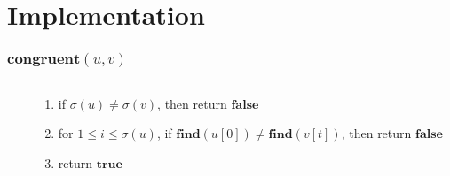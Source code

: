 \documentclass{beamer}
\begin{document}
\section{Implementation}

\begin{frame}[fragile]
  \frametitle{$\mathbf{congruent}(u, v)$}

  \begin{columns}[T]
    \begin{column}{0.5\textwidth}
    \end{column}
    \begin{column}{0.5\textwidth}
      \begin{enumerate}
        \item if $\sigma(u) \neq \sigma(v)$, then return $\mathbf{false}$
        \item for $1 \leq i \leq \sigma(u)$, if $\mathbf{find}(u[0]) \neq \mathbf{find}(v[t])$,
          then return $\mathbf{false}$
        \item return $\mathbf{true}$
      \end{enumerate}
    \end{column}
  \end{columns}
\end{frame}
\end{document}
